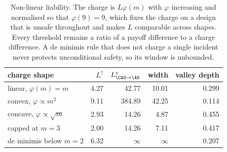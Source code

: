 \begin{table}[!ht]
\centering
\caption{Non-linear liability. The charge is $L\varphi(m)$ with $\varphi$ increasing and normalised so that $\varphi(9)=9$, which fixes the charge on a design that is unsafe throughout and makes $L$ comparable across shapes. Every threshold remains a ratio of a payoff difference to a charge difference. A de minimis rule that does not charge a single incident never protects unconditional safety, so its window is unbounded.}
\label{tab:charges}
\begin{tabular}{lrrrr}
\toprule
charge shape & $L^{\dagger}$ & $L^{*}_{\CAS\to\AS}$ & width & valley depth \\
\midrule
linear, $\varphi(m)=m$ & 4.27 & 42.77 & 10.01 & 0.299 \\
convex, $\varphi\propto m^{2}$ & 9.11 & 384.89 & 42.25 & 0.114 \\
concave, $\varphi\propto\sqrt{m}$ & 2.93 & 14.26 & 4.87 & 0.455 \\
capped at $m=3$ & 2.00 & 14.26 & 7.11 & 0.417 \\
de minimis below $m=2$ & 6.32 & $\infty$ & $\infty$ & 0.207 \\
\bottomrule
\end{tabular}
\end{table}
